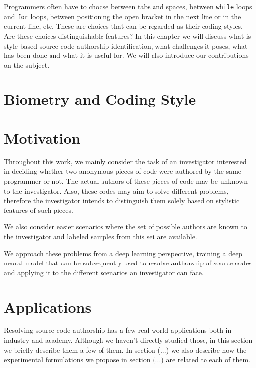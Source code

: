
Programmers often have to choose between tabs and spaces, between \texttt{while} loops and \texttt{for} loops, between positioning the open bracket in the next line or in the current line, etc. These are choices that can be regarded as their coding styles. Are these choices distinguishable features? In this chapter we will discuss what is style-based source code authorship identification, what challenges it poses, what has been done and what it is useful for. We will also introduce our contributions on the subject.

\section{Biometry and Coding Style}

\section{Motivation}

Throughout this work, we mainly consider the task of an investigator interested in deciding whether two anonymous pieces of code were authored by the same programmer or not. The actual authors of these pieces of code may be unknown to the investigator. Also, these codes may aim to solve different problems, therefore the investigator intends to distinguish them solely based on stylistic features of such pieces.

We also consider easier scenarios where the set of possible authors are known to the investigator and labeled samples from this set are available. %

We approach these problems from a deep learning perspective, training a deep neural model that can be subsequently used to resolve authorship of source codes and applying it to the different scenarios an investigator can face.

\section{Applications}

Resolving source code authorship has a few real-world applications both in industry and academy. Although we haven't directly studied those, in this section we briefly describe them a few of them. In section (...) we also describe how the experimental formulations we propose in section (...) are related to each of them.

